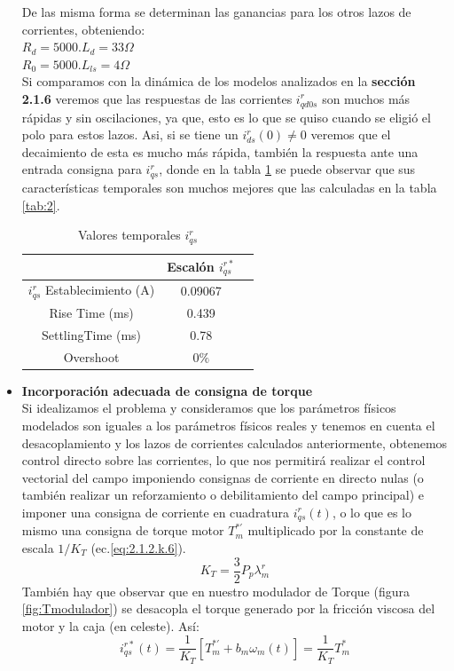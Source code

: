 \documentclass[10pt]{article}
\begin{document}
\begin{itemize}
	De las misma forma se determinan las ganancias para los otros lazos de corrientes, obteniendo:\\
	$R_{d}=5000 . L_{d}=33\Omega$\\
	$R_{0}=5000 . L_{ls}=4\Omega$\\
	Si comparamos con la dinámica de los modelos analizados en la \textbf{sección 2.1.6} veremos que las respuestas de las corrientes $i^{r}_{qd0s}$ son muchos más rápidas y sin oscilaciones, ya que, esto es lo que se quiso cuando se eligió el polo para estos lazos. Asi, si se tiene un $i^{r}_{ds}(0)\neq 0$ veremos que el decaimiento de esta es mucho más rápida, también la respuesta ante una entrada consigna para $i^{r}_{qs}$, donde en la tabla \ref{tab:3} se puede observar que sus características temporales son muchos mejores que las calculadas en la tabla \ref{tab:2}.
		\begin{table}[!h]
	\begin{center}
	\begin{tabular}{| c | c | c | }
	\hline
	  & Escalón $i^{r*}_{qs}$\\ \hline
	 $ i^{r}_{qs}$ Establecimiento (A) &   0.09067 \\ \hline
	 Rise Time (ms) &  0.439\\ \hline
	SettlingTime (ms)& 0.78\\ \hline
	Overshoot &0$\%$ \\ \hline
	\end{tabular}
	\caption{Valores temporales $i^{r}_{qs}$}
	\label{tab:3}
	\end{center}
	\end{table}
	
\item \textbf{Incorporación adecuada de consigna de torque}\\
Si idealizamos el problema y consideramos que los parámetros físicos modelados son iguales a los parámetros físicos reales y tenemos en cuenta el desacoplamiento y los lazos de corrientes calculados anteriormente, obtenemos control directo sobre las corrientes, lo que nos permitirá realizar el control vectorial del campo imponiendo consignas de corriente en directo nulas (o también realizar un reforzamiento o debilitamiento del campo principal) e imponer una consigna de corriente en cuadratura $i^{r}_{qs}(t)$, o  lo que es lo mismo una consigna de torque motor $T^{*'}_{m}$ multiplicado por la constante de escala $1/K_{T}$ (ec.\ref{eq:2.1.2.k.6}).
		\begin{equation}
	K_{T}=\frac{3}{2}P_{p}\lambda^{r}_{m}
	\label{eq:2.1.2.k.6}
	\end{equation}
	También hay que observar que en nuestro modulador de Torque (figura \ref{fig:Tmodulador}) se desacopla el torque generado por la fricción viscosa del motor y la caja (en celeste). Así:
			\begin{equation}
	i^{r*}_{qs}(t)=\frac{1}{K_{T}}[T^{*'}_{m}+b_{m}\omega_{m}(t)]=\frac{1}{K_{T}}T^{*}_{m}
	\label{eq:2.1.2.k.7}
	\end{equation}
	

\end{itemize}
\end{document}
